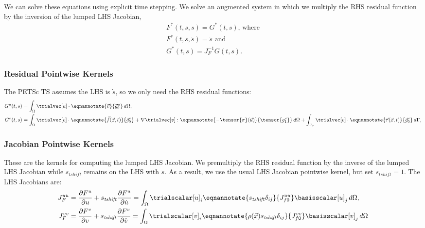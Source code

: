 We can solve these equations using explicit time stepping. We solve an
augmented system in which we multiply the RHS residual function by the
inversion of the lumped LHS Jacobian,
\begin{gather}
  F^*(t,s,\dot{s}) = G^*(t,s) \text{, where} \\
  F^*(t,s,\dot{s}) = \dot{s} \text{ and} \\
  G^*(t,s) = J_F^{-1} G(t,s).
\end{gather}


\subsubsection{Residual Pointwise Kernels}

The PETSc TS assumes the LHS is $\dot{s}$, so we only need the RHS residual functions:
\begin{align}
  G^u(t,s) &= \int_\Omega \trialvec[u] \cdot \eqnannotate{\vec{v}}{\vec{g}^u_0} \, d\Omega, \\
  G^v(t,s) &=  \int_\Omega \trialvec[v] \cdot \eqnannotate{\vec{f}(\vec{x},t)}{\vec{g}^v_0} + \nabla \trialvec[v] : \eqnannotate{-\tensor{\sigma}(\vec{u})}{\tensor{g^v_1}} \, d\Omega
  + \int_{\Gamma_\tau} \trialvec[v] \cdot \eqnannotate{\vec{\tau}(\vec{x},t)}{\vec{g}^v_0} \, d\Gamma,
\end{align}

\subsubsection{Jacobian Pointwise Kernels}

These are the kernels for computing the lumped LHS Jacobian. We
premultiply the RHS residual function by the inverse of the lumped LHS
Jacobian while $s_\mathit{tshift}$ remains on the LHS with
$\dot{s}$. As a result, we use the usual LHS Jacobian pointwise
kernel, but set $s_\mathit{tshift}=1$.  The LHS Jacobians are:
\begin{align}
  J_F^{uu} &= \frac{\partial F^u}{\partial u} + s_\mathit{tshift} \frac{\partial F^u}{\partial \dot{u}} =
             \int_\Omega \trialscalar[u]_i \eqnannotate{s_\mathit{tshift} \delta_{ij}}{J^{uu}_{f0}} \basisscalar[u]_j  \, d\Omega, \\
  J_F^{vv} &= \frac{\partial F^v}{\partial v} + s_\mathit{tshift} \frac{\partial F^v}{\partial \dot{v}} =
             \int_\Omega \trialscalar[v]_i \eqnannotate{\rho(\vec{x}) s_\mathit{tshift} \delta_{ij}}{J ^{vv}_{f0}} \basisscalar[v]_j \, d\Omega
\end{align}


